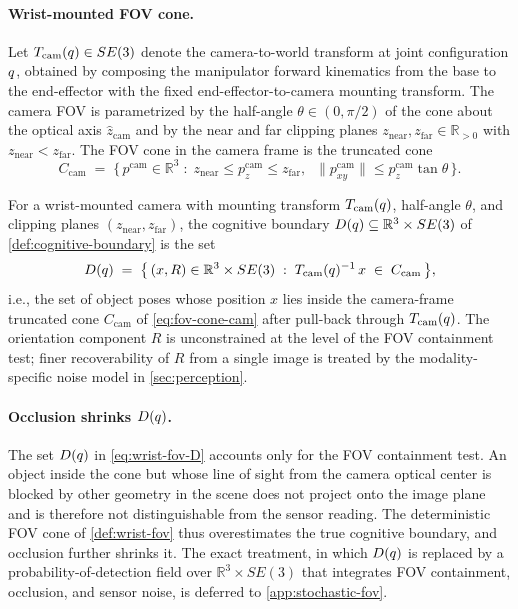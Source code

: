 \paragraph{Wrist-mounted FOV cone.}
Let $T_{\mathrm{cam}}(q) \in SE(3)$ denote the
camera-to-world transform at joint configuration $q$,
obtained by composing the manipulator forward kinematics from
the base to the end-effector with the fixed end-effector-to-camera
mounting transform. The camera FOV is parametrized by the
half-angle $\theta \in (0, \pi/2)$ of the cone about the optical
axis $\hat{z}_{\mathrm{cam}}$ and by the near and far clipping
planes $z_{\mathrm{near}}, z_{\mathrm{far}} \in \mathbb{R}_{>0}$
with $z_{\mathrm{near}} < z_{\mathrm{far}}$. The FOV cone in the
camera frame is the truncated cone
\begin{equation}
\label{eq:fov-cone-cam}
  C_{\mathrm{cam}}
  \;=\;
  \bigl\{\, p^{\mathrm{cam}} \in \mathbb{R}^{3}
  \;:\;
  z_{\mathrm{near}} \le p^{\mathrm{cam}}_{z} \le z_{\mathrm{far}},
  \;\;
  \|p^{\mathrm{cam}}_{xy}\| \le p^{\mathrm{cam}}_{z} \tan\theta
  \,\bigr\}.
\end{equation}

\begin{definition}
\label{def:wrist-fov}
For a wrist-mounted camera with mounting transform
$T_{\mathrm{cam}}(q)$, half-angle $\theta$, and clipping
planes $(z_{\mathrm{near}}, z_{\mathrm{far}})$, the cognitive
boundary $D(q) \subseteq \mathbb{R}^{3} \times SE(3)$ of
\cref{def:cognitive-boundary} is the set
\begin{equation}
\label{eq:wrist-fov-D}
  D(q)
  \;=\;
  \bigl\{\, (x, R) \in \mathbb{R}^{3} \times SE(3)
  \;:\;
  T_{\mathrm{cam}}(q)^{-1}\, x \;\in\; C_{\mathrm{cam}}
  \,\bigr\},
\end{equation}
i.e., the set of object poses whose position $x$ lies inside the
camera-frame truncated cone $C_{\mathrm{cam}}$ of
\eqref{eq:fov-cone-cam} after pull-back through
$T_{\mathrm{cam}}(q)$. The orientation component $R$ is
unconstrained at the level of the FOV containment test; finer
recoverability of $R$ from a single image is treated by the
modality-specific noise model in \cref{sec:perception}.
\end{definition}

\paragraph{Occlusion shrinks $D(q)$.}
The set $D(q)$ in \eqref{eq:wrist-fov-D} accounts only
for the FOV containment test. An object inside the cone but
whose line of sight from the camera optical center is blocked by
other geometry in the scene does not project onto the image
plane and is therefore not distinguishable from the sensor
reading. The deterministic FOV cone of \cref{def:wrist-fov} thus
overestimates the true cognitive boundary, and occlusion further
shrinks it. The exact treatment, in which $D(q)$ is
replaced by a probability-of-detection field over
$\mathbb{R}^{3} \times SE(3)$ that integrates FOV containment,
occlusion, and sensor noise, is deferred to
\cref{app:stochastic-fov}.

